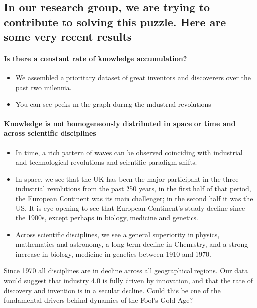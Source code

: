 \subsection{In our research group, we are trying to contribute to solving this
puzzle. Here are some very recent results}

\paragraph{Is there a constant rate of knowledge accumulation?}
\begin{itemize}
    \item We assembled a prioritary dataset of great inventors and discoverers
        over the past two milennia.
    \item You can see peeks in the graph during the industrial revolutions
\end{itemize}

\paragraph{Knowledge is not homogeneously distributed in space or time and across
scientific disciplines}

\begin{itemize}
    \item In time, a rich pattern of waves can be observed coinciding with industrial
        and technological revolutions and scientific paradigm shifts.
    \item In space, we see that the UK has been the major participant in the three
        industrial revolutions from the past 250 years, in the first half of that
        period, the European Continent was its main challenger; in the second
        half it was the US. It is eye-opening to see that European Continent's
        steady decline since the 1900s, except perhaps in biology, medicine
        and genetics.
    \item Across scientific disciplines, we see a general superiority in physics,
        mathematics and astronomy, a long-term decline in Chemistry, and a strong
        increase in biology, medicine in genetics between 1910 and 1970.
\end{itemize}
Since 1970 all disciplines are in decline across all geographical regions. Our
data would suggest that industry 4.0 is fully driven by innovation, and that
the rate of discovery and invention is in a secular decline. Could this be one
of the fundamental drivers behind dynamics of the Fool's Gold Age?


